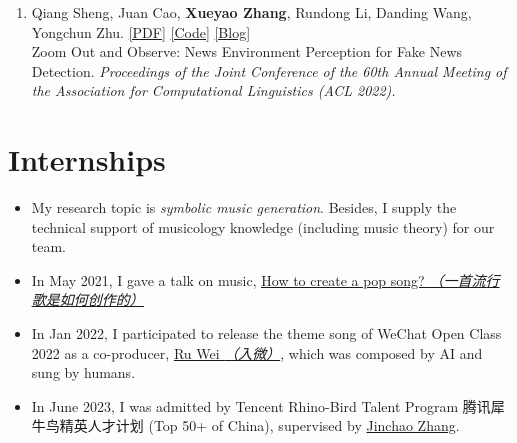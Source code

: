 \documentclass{resume}
\begin{document}
\begin{enumerate}
  \item Qiang Sheng, Juan Cao, \textbf{Xueyao Zhang}, Rundong Li, Danding Wang, Yongchun Zhu. \href{https://aclanthology.org/2022.acl-long.311.pdf}{[PDF]} \href{https://github.com/ICTMCG/News-Environment-Perception}{[Code]} \href{https://mp.weixin.qq.com/s/aTFeuCYIpSoazeRi52jqew}{[Blog]}\\Zoom Out and Observe: News Environment Perception for Fake News Detection. \textit{Proceedings of the Joint Conference of the 60th Annual Meeting of the Association for Computational Linguistics (ACL 2022).}
\end{enumerate}


\section{Internships}
{\small {}
}
\begin{itemize}
  \item My research topic is \textit{symbolic music generation}. Besides, I supply the technical support of musicology knowledge (including music theory) for our team. 
  \item In May 2021, I gave a talk on music, \href{https://www.zhangxueyao.com/data/wcpr-pop-music.pdf}{\underline{How to create a pop song? \textit{（一首流行歌是如何创作的）}}}
  \item In Jan 2022, I participated to release the theme song of WeChat Open Class 2022 as a co-producer, \href{https://y.qq.com/n/ryqq/songDetail/000xeNJ53orPG2}{Ru Wei \textit{（入微）}}, which was composed by AI and sung by humans.
  \item In June 2023, I was admitted by Tencent Rhino-Bird Talent Program 腾讯犀牛鸟精英人才计划 (Top 50+ of China), supervised by \href{https://scholar.google.com/citations?user=vH9YLsAAAAAJ&hl=en}{Jinchao Zhang}.
\end{itemize}
\end{document}
